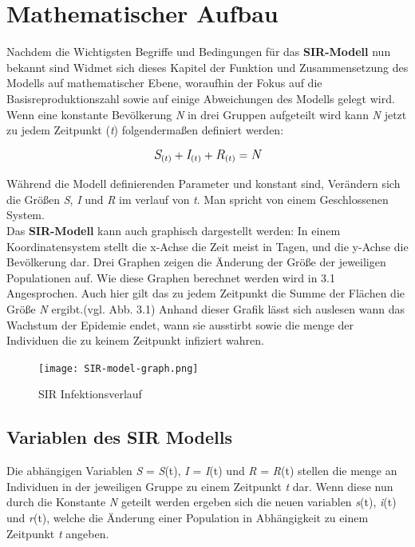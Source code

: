 \documentclass[12pt]{scrartcl} %
\begin{document}
\section{Mathematischer Aufbau}

Nachdem die Wichtigsten Begriffe und Bedingungen für das \textbf{SIR-Modell} nun bekannt sind Widmet sich dieses Kapitel der Funktion und Zusammensetzung des Modells auf mathematischer Ebene, woraufhin der Fokus auf die Basisreproduktionszahl sowie auf einige Abweichungen des Modells gelegt wird.
Wenn eine konstante Bevölkerung \textit{N} in drei Gruppen aufgeteilt wird kann \textit{N} jetzt zu jedem Zeitpunkt (\textit{t}) folgendermaßen definiert werden: 
\cite{3, 4}

$$ \large\textit{S}_{(t)} + \textit{I}_{(t)} + \textit{R}_{(t)} = \textit{N}\normalsize $$

Während die Modell definierenden Parameter \textbeta\space und \textgamma\space konstant sind, Verändern sich die Größen \textit{S}, \textit{I} und \textit{R} im verlauf von \textit{t}. Man spricht von einem Geschlossenen System.\cite[vgl. s.2]{4}\\
Das \textbf{SIR-Modell} kann auch graphisch dargestellt werden:
In einem Koordinatensystem stellt die x-Achse die Zeit meist in Tagen, und die y-Achse die Bevölkerung dar. Drei Graphen zeigen die Änderung der Größe der jeweiligen Populationen auf. Wie diese Graphen berechnet werden wird in 3.1 Angesprochen.
Auch hier gilt das zu jedem Zeitpunkt die Summe der Flächen die Größe \textit{N} ergibt.(vgl. Abb. 3.1)
Anhand dieser Grafik lässt sich auslesen wann das Wachstum der Epidemie endet, wann sie ausstirbt sowie die menge der Individuen die zu keinem Zeitpunkt infiziert wahren.

	\begin{figure}[h]
	\centering
	\texttt{[image: SIR-model-graph.png]} 
	\caption{SIR Infektionsverlauf}
	\end{figure}
	

\subsection{Variablen des SIR Modells}

Die abhängigen Variablen \textit{S} = \textit{S}(t), \textit{I} = \textit{I}(t) und \textit{R} = \textit{R}(t) stellen die menge an Individuen in der jeweiligen Gruppe zu einem Zeitpunkt \textit{t} dar. Wenn diese nun durch die Konstante \textit{N} geteilt werden ergeben sich die neuen variablen \textit{s}(t), \textit{i}(t) und \textit{r}(t), welche die Änderung einer Population in Abhängigkeit zu einem Zeitpunkt \textit{t} angeben.
\end{document}
